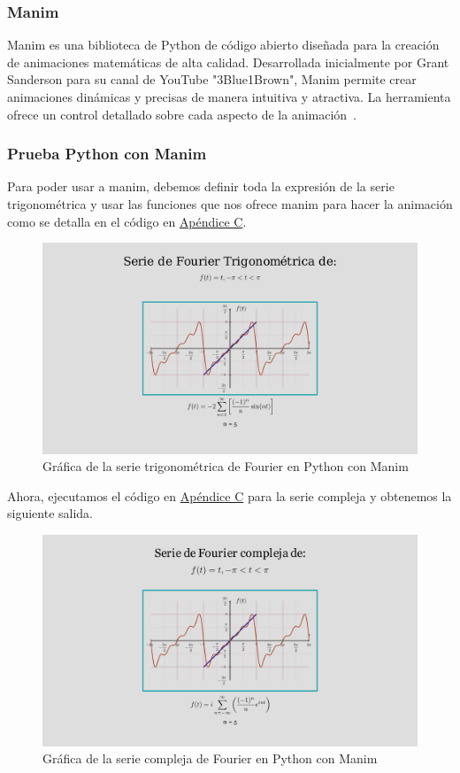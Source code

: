 \subsubsection{Manim}
Manim es una biblioteca de Python de código abierto diseñada para la creación de animaciones matemáticas de alta calidad. Desarrollada inicialmente por Grant Sanderson para su canal de YouTube "3Blue1Brown", Manim permite crear animaciones dinámicas y precisas de manera intuitiva y atractiva. La herramienta ofrece un control detallado sobre cada aspecto de la animación~\cite{Manim2024}.
\subsubsection{Prueba Python con Manim}
Para poder usar a manim, debemos definir toda la expresión de la serie trigonométrica y usar las funciones que nos ofrece manim para hacer la animación como se detalla en el código en \hyperref[app3:trig-code-python-manim]{Apéndice C}.
\begin{figure}[H]
	\centering
	\includegraphics[width=1\textwidth]{img/chapter02/manim-trig-series-graph.jpg}
	\caption{Gráfica de la serie trigonométrica de Fourier en Python con Manim}
	\label{fig:python-manim-trig-series}  %
\end{figure}
Ahora, ejecutamos el código en \hyperref[app3:complex-code-python-manim]{Apéndice C} para la serie compleja y obtenemos la siguiente salida.
\begin{figure}[H]
	\centering
	\includegraphics[width=1\textwidth]{img/chapter02/manim-complex-series-graph.jpg}
	\caption{Gráfica de la serie compleja de Fourier en Python con Manim}
	\label{fig:python-manim-complex-series}  %
\end{figure}
